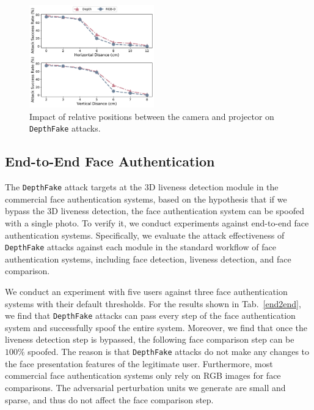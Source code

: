 \begin{figure}[pt]
	\centerline{\includegraphics[width = 0.48\textwidth]{figures/related_position.pdf}}
	\vspace{-0.15in}
	\caption{Impact of relative positions between the camera and projector on \texttt{DepthFake} attacks. }
	\label{realted_position}
	\vspace{-0.1in}
\end{figure}



\subsection{End-to-End Face Authentication}

The \texttt{DepthFake} attack targets at the 3D liveness detection module in the commercial face authentication systems, based on the hypothesis that if we bypass the 3D liveness detection,  the face authentication system can be spoofed with a single photo.
To verify it,  we conduct experiments against end-to-end face authentication systems. Specifically, we evaluate the attack effectiveness of \texttt{DepthFake} attacks against each module in the standard workflow of face authentication systems, including face detection, liveness detection, and face comparison. 

We conduct an experiment with five users against three face authentication systems with their default thresholds.
For the results shown in Tab.~\ref{end2end}, we find that \texttt{DepthFake} attacks can pass every step of the face authentication system and successfully spoof the entire system. Moreover, we find that once the liveness detection step is bypassed, the following face comparison step can be $100\%$ spoofed. The reason is that \texttt{DepthFake} attacks do not make any changes to the face presentation features of the legitimate user. Furthermore, most commercial face authentication systems only rely on RGB images for face comparisons. The adversarial perturbation units we generate are small and sparse, and thus do not affect the face comparison step.



